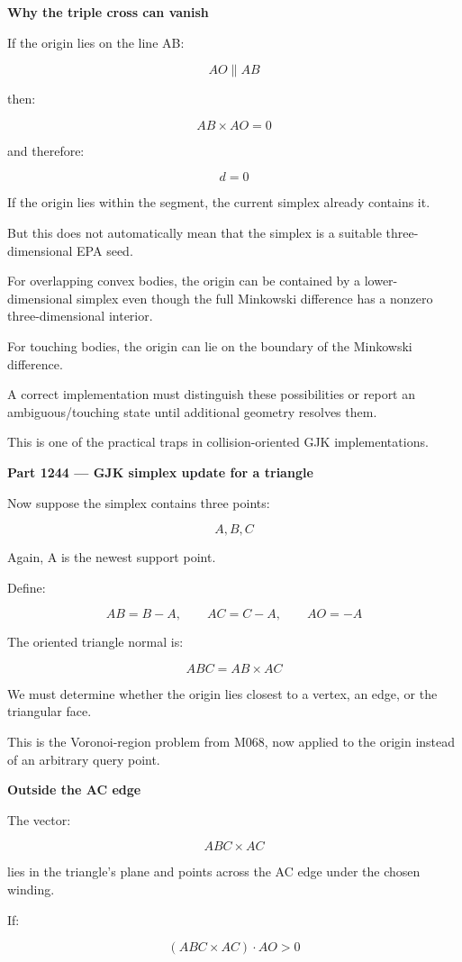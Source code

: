 \textbf{Why the triple cross can vanish}

If the origin lies on the line AB:

\[
AO\parallel AB
\]

then:

\[
AB\times AO=0
\]

and therefore:

\[
d=0
\]

If the origin lies within the segment, the current simplex already contains it.

But this does not automatically mean that the simplex is a suitable three-dimensional EPA seed.

For overlapping convex bodies, the origin can be contained by a lower-dimensional simplex even though the full Minkowski difference has a nonzero three-dimensional interior.

For touching bodies, the origin can lie on the boundary of the Minkowski difference.

A correct implementation must distinguish these possibilities or report an ambiguous/touching state until additional geometry resolves them.

This is one of the practical traps in collision-oriented GJK implementations.

\textbf{Part 1244 --- GJK simplex update for a triangle}

Now suppose the simplex contains three points:

\[
A,B,C
\]

Again, A is the newest support point.

Define:

\[
AB=B-A,\qquad AC=C-A,\qquad AO=-A
\]

The oriented triangle normal is:

\[
\boxed{ ABC=AB\times AC }
\]

We must determine whether the origin lies closest to a vertex, an edge, or the triangular face.

This is the Voronoi-region problem from M068, now applied to the origin instead of an arbitrary query point.

\textbf{Outside the AC edge}

The vector:

\[
ABC\times AC
\]

lies in the triangle's plane and points across the AC edge under the chosen winding.

If:

\[
\boxed{ (ABC\times AC)\cdot AO>0 }
\]

